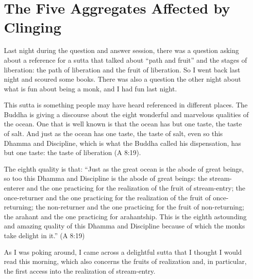 \chapter{The Five Aggregates Affected by
Clinging}

Last night during the question and answer session, there was a question
asking about a reference for a sutta that talked about “path and fruit”
and the stages of liberation: the path of liberation and the fruit of
liberation. So I went back last night and scoured some books. There was
also a question the other night about what is fun about being a monk,
and I had fun last night.

This sutta is something people may have heard referenced in different
places. The Buddha is giving a discourse about the eight wonderful and
marvelous qualities of the ocean. One that is well known is that the
ocean has but one taste, the taste of salt. And just as the ocean has
one taste, the taste of salt, even so this Dhamma and Discipline, which
is what the Buddha called his dispensation, has but one taste: the taste
of liberation (A 8:19).

The eighth quality is that: “Just as the great ocean is the abode of
great beings, so too this Dhamma and Discipline is the abode of great
beings: the stream-enterer and the one practicing for the realization of
the fruit of stream-entry; the once-returner and the one practicing for
the realization of the fruit of once-returning; the non-returner and the
one practicing for the fruit of non-returning; the arahant and the one
practicing for arahantship. This is the eighth astounding and amazing
quality of this Dhamma and Discipline because of which the monks take
delight in it.” (A 8:19)

As I was poking around, I came across a delightful sutta that I thought
I would read this morning, which also concerns the fruits of realization
and, in particular, the first access into the realization of
stream-entry.

